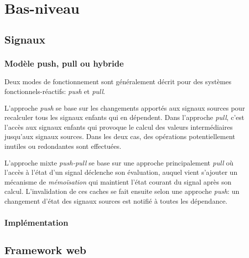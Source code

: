 \chapter{Bas-niveau}

\section{Signaux}

\subsection{Modèle push, pull ou hybride}

Deux modes de fonctionnement sont généralement décrit pour des systèmes fonctionnels-réactifs: \emph{push} et \emph{pull}.

L'approche \emph{push} se base sur les changements apportés aux signaux sources pour recalculer tous les signaux enfants qui en dépendent. Dans l'approche \emph{pull}, c'est l'accès aux signaux enfants qui provoque le calcul des valeurs intermédiaires jusqu'aux signaux sources. Dans les deux cas, des opérations potentiellement inutiles ou redondantes sont effectuées.

L'approche mixte \emph{push-pull} se base sur une approche principalement \emph{pull} où l'accès à l'état d'un signal déclenche son évaluation, auquel vient s'ajouter un mécanisme de \emph{mémoïsation} qui maintient l'état courant du signal après son calcul. L'invalidation de ces caches se fait ensuite selon une approche \emph{push}: un changement d'état des signaux sources est notifié à toutes les dépendance.

\subsection{Implémentation}

\section{Framework web}
